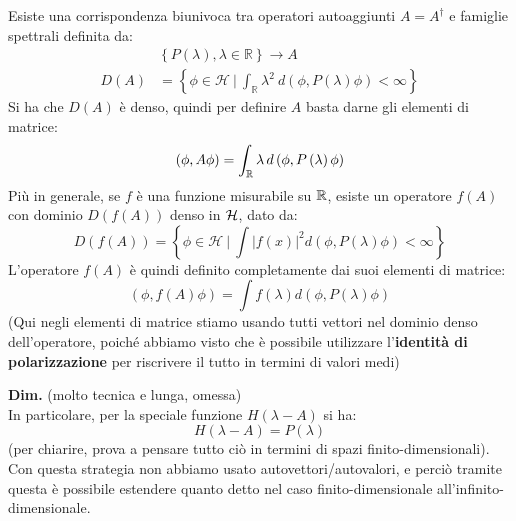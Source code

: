 \documentclass[../../FisicaTeorica.tex]{subfiles}
\begin{document}
\begin{thm}
Esiste una corrispondenza biunivoca tra operatori autoaggiunti $A=A^\dag$ e famiglie spettrali definita da:
\begin{align}
\nonumber &\left\{P\left(\lambda\right),\lambda\in\mathbb{R}\right\}\rightarrow A\\
D\left(A\right)&= \left\{\phi\in\mathcal{H}\ |\ \int_{\mathbb{R}}{\lambda^2\ d\left(\phi,P\left(\lambda\right)\phi\right)<\infty}\right\} 
\label{eqn:dominiofamigliaspettrale}
\end{align}
Si ha che $D(A)$ è denso, quindi per definire $A$ basta darne gli elementi di matrice:
\[
\left(\phi,A\phi\right)=\int_{\mathbb{R}} \lambda\, d\left(\phi,P\left(\lambda\right)\phi\right)
\]
Più in generale, se $f$ è una funzione misurabile su $\mathbb{R}$, esiste un operatore $f\left(A\right)$ con dominio $D(f(A))$ denso in $\mathcal{H}$, dato da:
\[
D\left(f\left(A\right)\right)= \left\{\phi\in\mathcal{H}\ |\ \int\left|f\left(x\right)\right|^2d\left(\phi,P\left(\lambda\right)\phi\right)<\infty\right\}
\]
L'operatore $f(A)$ è quindi definito completamente dai suoi elementi di matrice:
\[
\left(\phi,f\left(A\right)\phi\right)=\int f\left(\lambda\right) d(\phi , P\left(\lambda\right)\phi )
\]
(Qui negli elementi di matrice stiamo usando tutti vettori nel dominio denso dell'operatore, poiché abbiamo visto che è possibile utilizzare l'\textbf{identità di polarizzazione} per riscrivere il tutto in termini di valori medi)
\end{thm}
\textbf{Dim.} (molto tecnica e lunga, omessa)\\
In particolare, per la speciale funzione $H(\lambda-A)$ si ha:
\[
H(\lambda-A) = P(\lambda)
\]
(per chiarire, prova a pensare tutto ciò in termini di spazi finito-dimensionali).\\
Con questa strategia non abbiamo usato autovettori/autovalori, e perciò tramite questa è possibile estendere quanto detto nel caso finito-dimensionale all'infinito-dimensionale.
\end{document}
